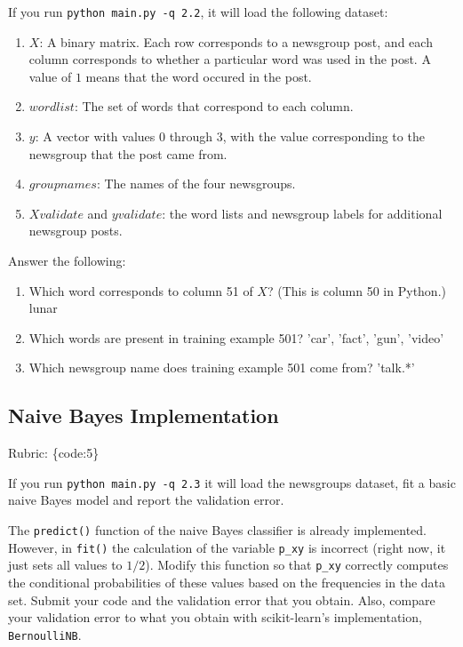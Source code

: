\documentclass{article}
\def\rubric#1{\gre{Rubric: \{#1\}}}{}
\def\blu#1{{\color{blu}#1}}
\def\gre#1{{\color{gre}#1}}
\def\red#1{{\color{red}#1}}
\def\enum#1{\begin{enumerate}#1\end{enumerate}}
\begin{document}
If you run \texttt{python main.py -q 2.2}, it will load the following dataset:
\enum{
\item $X$: A binary matrix. Each row corresponds to a newsgroup post, and each column corresponds to whether a particular word was used in the post. A value of $1$ means that the word occured in the post.
\item $wordlist$: The set of words that correspond to each column.
\item $y$: A vector with values $0$ through $3$, with the value corresponding to the newsgroup that the post came from.
\item $groupnames$: The names of the four newsgroups.
\item $Xvalidate$ and $yvalidate$: the word lists and newsgroup labels for additional newsgroup posts.
}
\blu{Answer the following}:
\enum{
\item Which word corresponds to column 51 of $X$? (This is column 50 in Python.) \red{lunar}
\item Which words are present in training example 501? \red{'car', 'fact', 'gun', 'video'}
\item Which newsgroup name does training example 501 come from? \red{'talk.*'}
}

\subsection{Naive Bayes Implementation}
\rubric{code:5}

If you run \texttt{python main.py -q 2.3}
it will load the newsgroups dataset, fit a basic naive Bayes model and report the validation error.

The \texttt{predict()} function of the naive Bayes classifier is already implemented.
However, in \texttt{fit()}
the calculation of the variable \texttt{p\_xy} is incorrect
(right now, it just sets all values to $1/2$).
\blu{Modify this function so that \texttt{p\_xy} correctly
computes the conditional probabilities of these values based on the
frequencies in the data set. Submit your code and the validation error that you obtain.
Also, compare your validation error to what you obtain with scikit-learn's implementation, \texttt{BernoulliNB}.}
\end{document}
